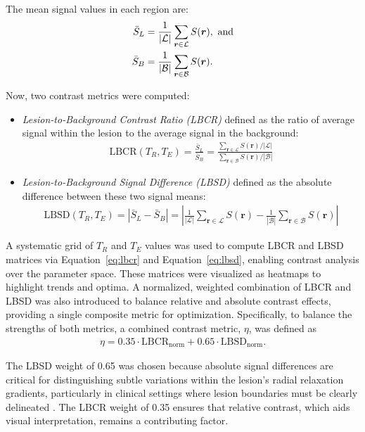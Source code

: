 \documentclass[10pt,a4paper,twoside]{article}
\begin{document}
The mean signal values in each region are:
\begin{align}
\bar{S}_L &= \frac{1}{|\mathcal{L}|} \sum_{\bm{r} \in \mathcal{L}} S(\bm{r}), \ \text{and} \notag \\
\bar{S}_B &= \frac{1}{|\mathcal{B}|} \sum_{\bm{r} \in \mathcal{B}} S(\bm{r}). \notag
\end{align}

Now, two contrast metrics were computed:
\begin{itemize}
    \item \textit{Lesion-to-Background Contrast Ratio (LBCR)} defined as the ratio of average signal within the lesion to the average signal in the background:
    \begin{align}
    \mathrm{LBCR}(T_R, T_E) = \frac{\bar{S}_L}{\bar{S}_B} 
    = \frac{\displaystyle \sum_{\bm{r} \in \mathcal{L}} S(\bm{r}) / |\mathcal{L}|}
           {\displaystyle \sum_{\bm{r} \in \mathcal{B}} S(\bm{r}) / |\mathcal{B}|} \label{eq:lbcr}
    \end{align}
    \item \textit{Lesion-to-Background Signal Difference (LBSD)} defined as the absolute difference between these two signal means:
    \begin{align}
    \mathrm{LBSD}(T_R, T_E) = \left| \bar{S}_L - \bar{S}_B \right|
    = \left| \frac{1}{|\mathcal{L}|} \sum_{\bm{r} \in \mathcal{L}} S(\bm{r}) - \frac{1}{|\mathcal{B}|} \sum_{\bm{r} \in \mathcal{B}} S(\bm{r}) \right| \label{eq:lbsd}
    \end{align}
\end{itemize}

A systematic grid of \( T_R \) and \( T_E \) values was used to compute LBCR and LBSD matrices via Equation~\eqref{eq:lbcr} and Equation~\eqref{eq:lbsd}, enabling contrast analysis over the parameter space. These matrices were visualized as heatmaps to highlight trends and optima. A normalized, weighted combination of LBCR and LBSD was also introduced to balance relative and absolute contrast effects, providing a single composite metric for optimization. Specifically, to balance the strengths of both metrics, a combined contrast metric, $\eta$, was defined as
\begin{align}
    \eta = 0.35 \cdot \text{LBCR}_\text{norm} + 0.65 \cdot \text{LBSD}_\text{norm}. \label{eq:combinedmetric}
\end{align}

The LBSD weight of 0.65 was chosen because absolute signal differences are critical for distinguishing subtle variations within the lesion’s radial relaxation gradients, particularly in clinical settings where lesion boundaries must be clearly delineated \cite{does2002}. The LBCR weight of 0.35 ensures that relative contrast, which aids visual interpretation, remains a contributing factor. 
\end{document}
